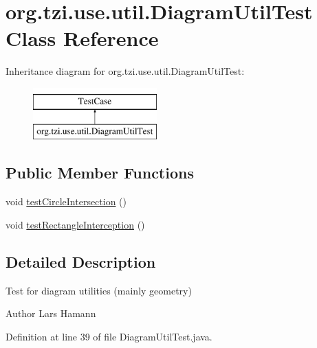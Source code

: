 \hypertarget{classorg_1_1tzi_1_1use_1_1util_1_1_diagram_util_test}{\section{org.\-tzi.\-use.\-util.\-Diagram\-Util\-Test Class Reference}
\label{classorg_1_1tzi_1_1use_1_1util_1_1_diagram_util_test}
}
Inheritance diagram for org.\-tzi.\-use.\-util.\-Diagram\-Util\-Test\-:\begin{figure}[H]
\begin{center}
\leavevmode
\includegraphics[height=2.000000cm]{classorg_1_1tzi_1_1use_1_1util_1_1_diagram_util_test}
\end{center}
\end{figure}
\subsection*{Public Member Functions}
\begin{DoxyCompactItemize}
\item 
void \hyperlink{classorg_1_1tzi_1_1use_1_1util_1_1_diagram_util_test_aed9c81d5eb92debc25abade63789e7a9}{test\-Circle\-Intersection} ()
\item 
void \hyperlink{classorg_1_1tzi_1_1use_1_1util_1_1_diagram_util_test_a738557fddc42c5901cd61785d4e1fcbb}{test\-Rectangle\-Interception} ()
\end{DoxyCompactItemize}


\subsection{Detailed Description}
Test for diagram utilities (mainly geometry) \begin{DoxyAuthor}{Author}
Lars Hamann 
\end{DoxyAuthor}


Definition at line 39 of file Diagram\-Util\-Test.\-java.



